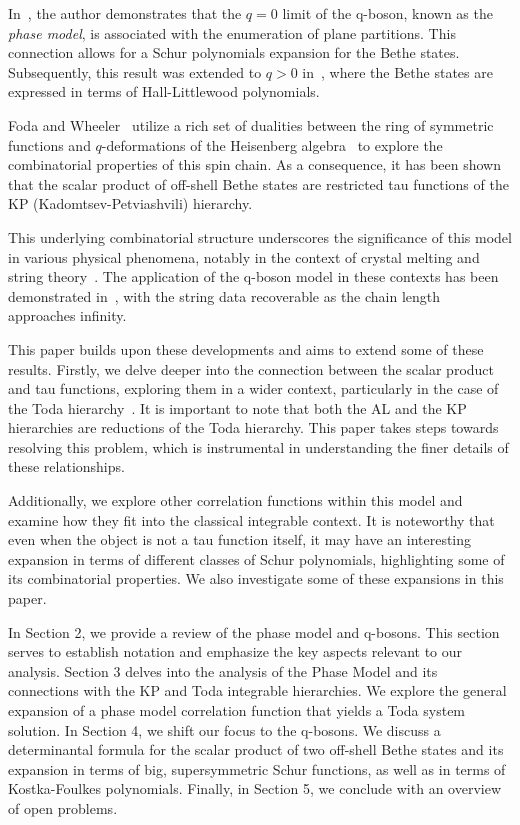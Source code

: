 \documentclass[a4paper,11pt]{amsart}
\begin{document}
In~\cite{Bogoliubov2005}, the author demonstrates that the \(q = 0\)
limit of the q-boson, known as the \emph{phase model}, is associated
with the enumeration of plane partitions. This connection allows for a
Schur polynomials expansion for the Bethe states. Subsequently, this
result was extended to \(q > 0\) in~\cite{Tsilevich:2006}, where the
Bethe states are expressed in terms of Hall-Littlewood polynomials.

Foda and Wheeler~\cite{Foda:2008hn, Wheeler:2010vmq} utilize a rich
set of dualities between the ring of symmetric functions and
\(q\)-deformations of the Heisenberg algebra~\cite{Jing1991, Jing1995}
to explore the combinatorial properties of this spin chain. As a
consequence, it has been shown that the scalar product of off-shell
Bethe states are restricted tau functions of the KP
(Kadomtsev-Petviashvili) hierarchy.

This underlying combinatorial structure underscores the significance
of this model in various physical phenomena, notably in the context of
crystal melting and string theory~\cite{Okounkov:2003sp,
  Saulina:2004da}. The application of the q-boson model in these
contexts has been demonstrated in~\cite{Sulkowski:2008mx}, with the
string data recoverable as the chain length approaches infinity.

This paper builds upon these developments and aims to extend some of
these results. Firstly, we delve deeper into the connection between
the scalar product and tau functions, exploring them in a wider
context, particularly in the case of the Toda
hierarchy~\cite{Takasaki:2018wsv}. It is important to note that both
the AL and the KP hierarchies are reductions of the Toda
hierarchy. This paper takes steps towards resolving this problem,
which is instrumental in understanding the finer details of these
relationships.

Additionally, we explore other correlation functions within this model
and examine how they fit into the classical integrable context. It is
noteworthy that even when the object is not a tau function itself, it
may have an interesting expansion in terms of different classes of
Schur polynomials, highlighting some of its combinatorial
properties. We also investigate some of these expansions in this
paper.

In Section 2, we provide a review of the phase model and
q-bosons. This section serves to establish notation and emphasize the
key aspects relevant to our analysis.  Section 3 delves into the
analysis of the Phase Model and its connections with the KP and Toda
integrable hierarchies. We explore the general expansion of a phase
model correlation function that yields a Toda system solution.  In
Section 4, we shift our focus to the q-bosons. We discuss a
determinantal formula for the scalar product of two off-shell Bethe
states and its expansion in terms of big, supersymmetric Schur
functions, as well as in terms of Kostka-Foulkes polynomials.
Finally, in Section 5, we conclude with an overview of open problems.
\end{document}
